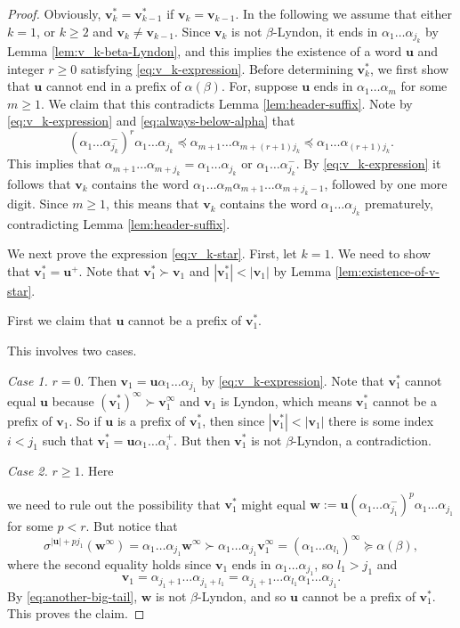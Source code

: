 \documentclass[11pt]{amsart}
\theoremstyle{definition}
\theoremstyle{remark}
\numberwithin{equation}{section}
\renewcommand{\u}{\mathbf{u}}
\renewcommand{\v}{\mathbf{v}}
\newcommand{\w}{\mathbf{w}}
\newcommand{\f}{\infty}
\newcommand{\al}{\alpha}
\newcommand{\lle}{\preccurlyeq}
\newcommand{\lge}{\succcurlyeq}
\newcommand{\si}{\sigma}
\begin{document}
\begin{proof}
{Obviously, $\v_k^*=\v_{k-1}^*$ if $\v_k=\v_{k-1}$. In the following we}
assume that either $k=1$, or $k\geq 2$ and $\v_k\neq \v_{k-1}$. {Since $\v_k$ is not $\beta$-Lyndon, it ends in $\al_1\dots\al_{j_k}$ by Lemma \ref{lem:v_k-beta-Lyndon}}, and this implies the existence of a word $\u$ and integer $r\geq 0$ satisfying \eqref{eq:v_k-expression}. Before determining $\v_k^*$, we first show that $\u$ cannot end in a prefix of $\al(\beta)$. For, suppose $\u$ ends in $\al_1\dots\al_m$ for some $m\geq 1$. We claim that this contradicts Lemma \ref{lem:header-suffix}. Note by \eqref{eq:v_k-expression} and \eqref{eq:always-below-alpha} that
\[
(\al_1\dots\al_{j_k}^-)^r\al_1\dots\al_{j_k}\lle \al_{m+1}\dots \al_{m+(r+1)j_k}\lle \al_1\ldots \al_{(r+1)j_k}.
\]
This implies that $\al_{m+1}\dots\al_{m+j_k}=\al_1\dots\al_{j_k}$ or $\al_1\dots\al_{j_k}^-$. By \eqref{eq:v_k-expression} it follows that $\v_k$ contains the word $\al_1\dots\al_m\al_{m+1}\dots\al_{m+j_k-1}$, followed by one more digit. Since $m\geq 1$, this means that $\v_k$ contains the word $\al_1\dots\al_{j_k}$ prematurely, contradicting Lemma \ref{lem:header-suffix}.

We next prove the expression \eqref{eq:v_k-star}. First, let $k=1$. We need to show that $\v_1^*=\u^+$. Note that $\v_1^*\succ \v_1$ and $|\v_1^*|<|\v_1|$ by Lemma \ref{lem:existence-of-v-star}. 

First we claim that $\u$ cannot be a prefix of $\v_1^*$. {This involves two cases.

{\em Case 1.} $r=0$. Then $\v_1=\u\al_1\dots\al_{j_1}$ by \eqref{eq:v_k-expression}. Note that $\v_1^*$ cannot equal $\u$ because $(\v_1^*)^\f\succ\v_1^\f$ and $\v_1$ is Lyndon, which means $\v_1^*$ cannot be a prefix of $\v_1$. So if $\u$ is a prefix of $\v_1^*$, then since $|\v_1^*|<|\v_1|$ there is some index $i<j_1$ such that $\v_1^*=\u\al_1\dots\al_i^+$. But then $\v_1^*$ is not $\beta$-Lyndon, a contradiction.

{\em Case 2.} $r\geq 1$. Here} we need to rule out the possibility that $\v_1^*$ might equal $\w:=\u(\al_1\dots\al_{j_1}^-)^p\al_1\dots\al_{j_1}$ for some $p<r$. But notice that
\begin{equation} \label{eq:another-big-tail}
\si^{|\u|+pj_1}(\w^\f)=\al_1\dots\al_{j_1}\w^\f\succ \al_1\dots\al_{j_1}\v_1^\f=(\al_1\dots\al_{l_1})^\f\lge \al(\beta),
\end{equation}
where the second equality holds since $\v_1$ ends in $\al_1\dots\al_{j_1}$, so $l_1>j_1$ and 
$$\v_1=\al_{j_1+1}\dots\al_{j_1+l_1}=\al_{j_1+1}\dots\al_{l_1}\al_1\dots\al_{j_1}.$$
By \eqref{eq:another-big-tail}, $\w$ is not $\beta$-Lyndon, and so $\u$ cannot be a prefix of $\v_1^*$. This proves the claim.


\end{proof}
\end{document}
